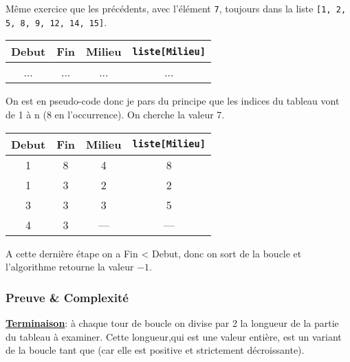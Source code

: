 \documentclass[12pt]{article}
\begin{document}
	\begin{MonExo}
		Même exercice que les précédents, avec l'élément \texttt{7}, toujours dans la liste \texttt{[1, 2, 5, 8, 9, 12, 14, 15]}.
		
		\begin{tabular}{|c|c|c|c|}
			\hline
			\textbf{Debut} & \textbf{Fin} & \textbf{Milieu} & \textbf{\texttt{liste[Milieu]}}\\
			\hline
			... & ... & ... & ...\\
			\hline 
		\end{tabular}
	\end{MonExo}
	
	\begin{MaReponse}
		On est en pseudo-code donc je pars du principe que les indices du tableau vont de 1 à n (8 en l'occurrence). On cherche la valeur 7.
		
		\begin{tabular}{|c|c|c|c|}
			\hline
			\textbf{Debut} & \textbf{Fin} & \textbf{Milieu} & \textbf{\texttt{liste[Milieu]}}\\
			\hline
			1 & 8 & 4 & 8\\
			\hline 
			1 & 3 & 2 & 2 \\
			\hline 
			3 & 3 & 3 & 5 \\
			\hline
			4 & 3 & --- & --- \\
			\hline
		\end{tabular}
		
		A cette dernière étape on a Fin < Debut, donc on sort de la boucle et l'algorithme retourne  la valeur $-1$.
	\end{MaReponse}
	
	\subsubsection*{Preuve \& Complexité}
	\textbf{\uline{Terminaison}}: à chaque tour de boucle on divise par 2 la longueur de la partie du tableau à examiner. Cette longueur,qui est une valeur entière, est un variant de la boucle tant que (car elle est positive et strictement décroissante).
	
\end{document}
